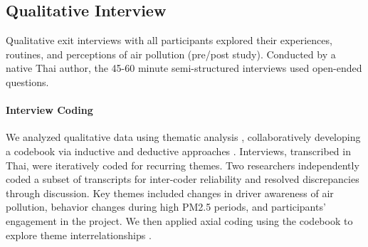\subsection{Qualitative Interview}

Qualitative exit interviews with all participants explored their experiences, routines, and perceptions of air pollution (pre/post study).
Conducted by a native Thai author, the 45-60 minute semi-structured interviews used open-ended questions. 

\paragraph{Interview Coding}


We analyzed qualitative data using thematic analysis \cite{braun2006using}, collaboratively developing a codebook via inductive and deductive approaches \cite{saldana2021coding,kathleen2008team}.
Interviews, transcribed in Thai, were iteratively coded for recurring themes.
Two researchers independently coded a subset of transcripts for inter-coder reliability and resolved discrepancies through discussion.
Key themes included changes in driver awareness of air pollution, behavior changes during high PM2.5 periods, and participants' engagement in the project.
We then applied axial coding using the codebook to explore theme interrelationships \cite{williams2019art}.



